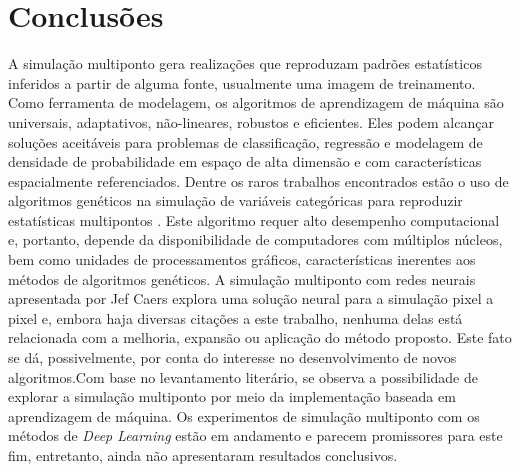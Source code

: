 \documentclass[11pt]{article}
\begin{document}
\section{Conclusões}
A simulação multiponto gera realizações que reproduzam padrões estatísticos inferidos a partir de alguma fonte, usualmente uma imagem de treinamento. 
Como ferramenta de modelagem, os algoritmos de aprendizagem de máquina são universais, adaptativos, não-lineares, robustos e eficientes. 
Eles podem alcançar soluções aceitáveis para problemas de classificação, regressão e modelagem de densidade de probabilidade em espaço de alta dimensão 
e com características espacialmente referenciados. Dentre os raros trabalhos encontrados estão o uso de algoritmos genéticos na simulação de variáveis
categóricas para reproduzir estatísticas multipontos \cite{Peredo2012}. Este algoritmo 
requer alto desempenho computacional e, portanto, depende da disponibilidade de computadores com múltiplos núcleos, bem como unidades de processamentos 
gráficos, características inerentes aos métodos de algoritmos genéticos. A simulação multiponto com redes neurais apresentada por Jef Caers \cite{caers_1998} explora uma 
solução neural para a simulação pixel a pixel e, embora haja diversas citações a este trabalho, nenhuma delas está relacionada com a melhoria, expansão 
ou aplicação do método proposto. Este fato se dá, possivelmente, por conta do interesse no desenvolvimento de novos algoritmos.Com base no levantamento literário, se observa a possibilidade de explorar a simulação multiponto por meio da 
implementação baseada em aprendizagem de máquina. Os experimentos de simulação multiponto com os métodos de \textit{Deep Learning} estão em andamento e
parecem promissores para este fim, entretanto, ainda não apresentaram resultados conclusivos.

\nocite{*}

\begin{spacing}{1}
   
   
 \end{spacing}
\end{document}
